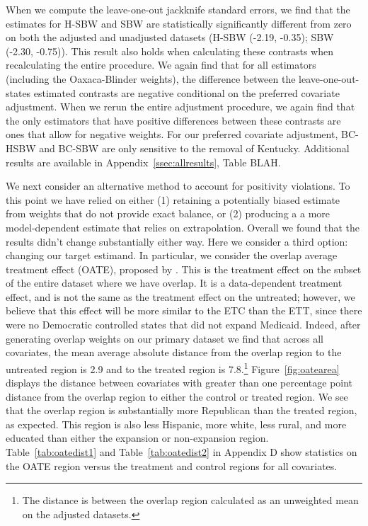 \documentclass[12pt]{article}
\begin{document}
When we compute the leave-one-out jackknife standard errors, we find that the estimates for H-SBW and SBW are statistically significantly different from zero on both the adjusted and unadjusted datasets (H-SBW (-2.19, -0.35); SBW (-2.30, -0.75)). This result also holds when calculating these contrasts when recalculating the entire procedure. We again find that for all estimators (including the Oaxaca-Blinder weights), the difference between the leave-one-out-states estimated contrasts are negative conditional on the preferred covariate adjustment. When we rerun the entire adjustment procedure, we again find that the only estimators that have positive differences between these contrasts are ones that allow for negative weights. For our preferred covariate adjustment, BC-HSBW and BC-SBW are only sensitive to the removal of Kentucky. Additional results are available in Appendix~\ref{ssec:allresults}, Table BLAH. 

We next consider an alternative method to account for positivity violations. To this point we have relied on either (1) retaining a potentially biased estimate from weights that do not provide exact balance, or (2) producing a a more model-dependent estimate that relies on extrapolation. Overall we found that the results didn't change substantially either way. Here we consider a third option: changing our target estimand. In particular, we consider the overlap average treatment effect (OATE), proposed by \cite{li2018balancing}. This is the treatment effect on the subset of the entire dataset where we have overlap. It is a data-dependent treatment effect, and is not the same as the treatment effect on the untreated; however, we believe that this effect will be more similar to the ETC than the ETT, since there were no Democratic controlled states that did not expand Medicaid. Indeed, after generating overlap weights on our primary dataset we find that across all covariates, the mean average absolute distance from the overlap region to the untreated region is 2.9 and to the treated region is 7.8.\footnote{The distance is between the overlap region calculated as an unweighted mean on the adjusted datasets.} Figure~\ref{fig:oatearea} displays the distance between covariates with greater than one percentage point distance from the overlap region to either the control or treated region. We see that the overlap region is substantially more Republican than the treated region, as expected. This region is also less Hispanic, more white, less rural, and more educated than either the expansion or non-expansion region. Table~\ref{tab:oatedist1} and Table~\ref{tab:oatedist2} in Appendix D show statistics on the OATE region versus the treatment and control regions for all covariates.
\end{document}
